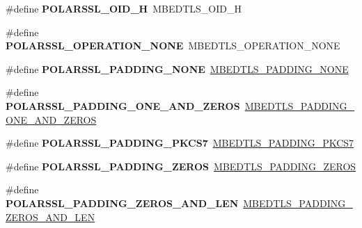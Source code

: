 \begin{DoxyCompactItemize}
\#define {\bfseries P\+O\+L\+A\+R\+S\+S\+L\+\_\+\+O\+I\+D\+\_\+H}~M\+B\+E\+D\+T\+L\+S\+\_\+\+O\+I\+D\+\_\+H
\item 
\mbox{\label{compat-1_83_8h_a9b0b1760eb496e48d3b649b38f5f77ca}} 
\#define {\bfseries P\+O\+L\+A\+R\+S\+S\+L\+\_\+\+O\+P\+E\+R\+A\+T\+I\+O\+N\+\_\+\+N\+O\+NE}~M\+B\+E\+D\+T\+L\+S\+\_\+\+O\+P\+E\+R\+A\+T\+I\+O\+N\+\_\+\+N\+O\+NE
\item 
\mbox{\label{compat-1_83_8h_a4e675dcb69f894a928e3669d7f164ebe}} 
\#define {\bfseries P\+O\+L\+A\+R\+S\+S\+L\+\_\+\+P\+A\+D\+D\+I\+N\+G\+\_\+\+N\+O\+NE}~\mbox{\hyperlink{cipher_8h_a5b57bc07ab7c430e9b4f29f3a5729837aace08abe82f9f79e57387133ceb07394}{M\+B\+E\+D\+T\+L\+S\+\_\+\+P\+A\+D\+D\+I\+N\+G\+\_\+\+N\+O\+NE}}
\item 
\mbox{\label{compat-1_83_8h_aaf24b87fb7c01adad03b50c67c87796d}} 
\#define {\bfseries P\+O\+L\+A\+R\+S\+S\+L\+\_\+\+P\+A\+D\+D\+I\+N\+G\+\_\+\+O\+N\+E\+\_\+\+A\+N\+D\+\_\+\+Z\+E\+R\+OS}~\mbox{\hyperlink{cipher_8h_a5b57bc07ab7c430e9b4f29f3a5729837a502732ab53a21eb0bf84e5a8e93609a7}{M\+B\+E\+D\+T\+L\+S\+\_\+\+P\+A\+D\+D\+I\+N\+G\+\_\+\+O\+N\+E\+\_\+\+A\+N\+D\+\_\+\+Z\+E\+R\+OS}}
\item 
\mbox{\label{compat-1_83_8h_a588ea750553948386f2f34c7cc410343}} 
\#define {\bfseries P\+O\+L\+A\+R\+S\+S\+L\+\_\+\+P\+A\+D\+D\+I\+N\+G\+\_\+\+P\+K\+C\+S7}~\mbox{\hyperlink{cipher_8h_a5b57bc07ab7c430e9b4f29f3a5729837a787071478fb192f36d4a085e010b28f9}{M\+B\+E\+D\+T\+L\+S\+\_\+\+P\+A\+D\+D\+I\+N\+G\+\_\+\+P\+K\+C\+S7}}
\item 
\mbox{\label{compat-1_83_8h_a181b8bbd10cdb869f0798f5280a8a34a}} 
\#define {\bfseries P\+O\+L\+A\+R\+S\+S\+L\+\_\+\+P\+A\+D\+D\+I\+N\+G\+\_\+\+Z\+E\+R\+OS}~\mbox{\hyperlink{cipher_8h_a5b57bc07ab7c430e9b4f29f3a5729837a339efb60a69e4b033a106c61cd8691e4}{M\+B\+E\+D\+T\+L\+S\+\_\+\+P\+A\+D\+D\+I\+N\+G\+\_\+\+Z\+E\+R\+OS}}
\item 
\mbox{\label{compat-1_83_8h_ac9040b33da9acb48df8cd8f92bc57db3}} 
\#define {\bfseries P\+O\+L\+A\+R\+S\+S\+L\+\_\+\+P\+A\+D\+D\+I\+N\+G\+\_\+\+Z\+E\+R\+O\+S\+\_\+\+A\+N\+D\+\_\+\+L\+EN}~\mbox{\hyperlink{cipher_8h_a5b57bc07ab7c430e9b4f29f3a5729837a93944bd7edfd0c6b6f362eb6eef1b4fc}{M\+B\+E\+D\+T\+L\+S\+\_\+\+P\+A\+D\+D\+I\+N\+G\+\_\+\+Z\+E\+R\+O\+S\+\_\+\+A\+N\+D\+\_\+\+L\+EN}}

\end{DoxyCompactItemize}
